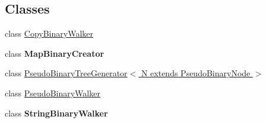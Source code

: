 \subsection*{Classes}
\begin{DoxyCompactItemize}
\item 
class \hyperlink{classit_1_1emarolab_1_1cagg_1_1core_1_1PseudoBinaryNode_1_1CopyBinaryWalker}{Copy\-Binary\-Walker}
\item 
class {\bfseries Map\-Binary\-Creator}
\item 
class \hyperlink{classit_1_1emarolab_1_1cagg_1_1core_1_1PseudoBinaryNode_1_1PseudoBinaryTreeGenerator_3_01N_01extends_01PseudoBinaryNode_01_4}{Pseudo\-Binary\-Tree\-Generator$<$ N extends Pseudo\-Binary\-Node $>$}
\item 
class \hyperlink{classit_1_1emarolab_1_1cagg_1_1core_1_1PseudoBinaryNode_1_1PseudoBinaryWalker}{Pseudo\-Binary\-Walker}
\item 
class {\bfseries String\-Binary\-Walker}
\end{DoxyCompactItemize}
